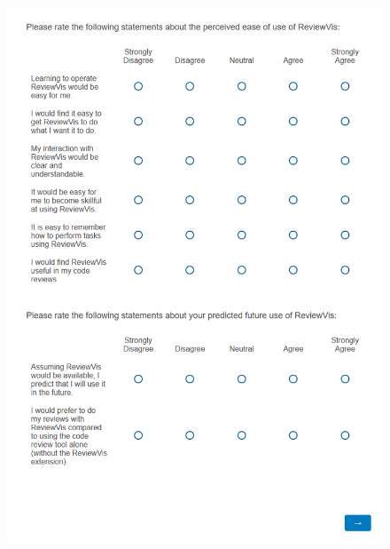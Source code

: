 \documentclass[a4paper,11pt,twoside]{article}
\theoremstyle{definition} %
\begin{document}
\begin{figure}[h]
    \centering
    \includegraphics[width=1.0\textwidth]{Subfigures/Appendices/Questionnaire/questionnaire_4.PNG}
\end{figure}
\end{document}
